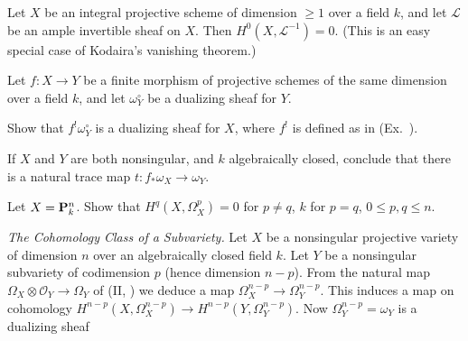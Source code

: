 {\Exercises
{\fontsize{9}{10.5}\selectfont\setlength{\parskip}{0pt}
\begin{description}[style=multiline,labelwidth=2.55em,leftmargin=2.85em,itemsep=4pt,topsep=0pt,parsep=0pt]
\item[\hypertarget{ex-III-7.1}{}7.1.] Let $X$ be an integral projective scheme of dimension $\ge1$ over a field $k$, and let $\mathcal L$ be an ample invertible sheaf on $X$. Then $H^0(X,\mathcal L^{-1})=0$. (This is an easy special case of Kodaira's vanishing theorem.)
\item[\hypertarget{ex-III-7.2}{}7.2.] Let $f\colon X\to Y$ be a finite morphism of projective schemes of the same dimension over a field $k$, and let $\omega_Y^\circ$ be a dualizing sheaf for $Y$.
\begin{parts}
\item Show that $f^!\omega_Y^\circ$ is a dualizing sheaf for $X$, where $f^!$ is defined as in (Ex.~).
\item If $X$ and $Y$ are both nonsingular, and $k$ algebraically closed, conclude that there is a natural trace map $t\colon f_*\omega_X\to\omega_Y$.
\end{parts}
\item[\hypertarget{ex-III-7.3}{}7.3.] Let $X=\mathbf{P}_k^n$. Show that $H^q(X,\Omega_X^p)=0$ for $p\ne q$, $k$ for $p=q$, $0\le p,q\le n$.
\item[\hypertarget{ex-III-7.4}{}*7.4.] \emph{The Cohomology Class of a Subvariety.} Let $X$ be a nonsingular projective variety of dimension $n$ over an algebraically closed field $k$. Let $Y$ be a nonsingular subvariety of codimension $p$ (hence dimension $n-p$). From the natural map $\Omega_X\otimes\mathcal O_Y\to\Omega_Y$ of (II, ) we deduce a map $\Omega_X^{n-p}\to\Omega_Y^{n-p}$. This induces a map on cohomology $H^{n-p}(X,\Omega_X^{n-p})\to H^{n-p}(Y,\Omega_Y^{n-p})$. Now $\Omega_Y^{n-p}=\omega_Y$ is a dualizing sheaf
\end{description}
}
}
